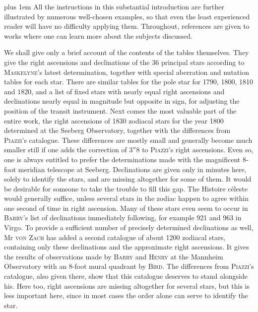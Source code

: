 \begingroup\rightskip=0pt plus 1em
All the instructions in this substantial introduction are further illustrated by numerous well-chosen examples, so that even the least experienced reader will have no difficulty applying them. Throughout, references are given to works where one can learn more about the subjects discussed.\par\endgroup

We shall give only a brief account of the contents of the tables themselves. They give the right ascensions and declinations of the 36 principal stars according to \textsc{Maskelyne}’s latest determination, together with special aberration and nutation tables for each star. There are similar tables for the pole star for 1790, 1800, 1810 and 1820, and a list of fixed stars with nearly equal right ascensions and declinations nearly equal in magnitude but opposite in sign, for adjusting the position of the transit instrument. Next comes the most valuable part of the entire work, the right ascensions of 1830 zodiacal stars for the year 1800 determined at the Seeberg Observatory, together with the differences from \textsc{Piazzi}’s catalogue. These differences are mostly small and generally become much smaller still if one adds the correction of $3''8$ to \textsc{Piazzi}’s right ascensions. Even so, one is always entitled to prefer the determinations made with the magnificent 8-foot meridian telescope at Seeberg. Declinations are given only in minutes here, solely to identify the stars, and are missing altogether for some of them. It would be desirable for someone to take the trouble to fill this gap. The Histoire céleste would generally suffice, unless several stars in the zodiac happen to agree within one second of time in right
ascension. Many of these stars even seem to occur in \textsc{Barry}’s list of declinations immediately following, for example 921 and 963 in Virgo. To provide a sufficient number of precisely determined declinations as well, Mr \textsc{von Zach} has added a second catalogue of about 1200 zodiacal stars, containing only these declinations and the approximate right ascensions. It gives the results of observations made by \textsc{Barry} and \textsc{Henry} at the Mannheim Observatory with an 8-foot mural quadrant by \textsc{Bird}. The differences from \textsc{Piazzi}’s catalogue, also given there, show that this catalogue deserves to stand alongside his. Here too, right ascensions are missing altogether for several stars, but this is less important here, since in most cases the order alone can serve to identify the star.

